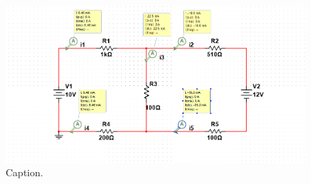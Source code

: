 \begin{figure}[tp]
    \centering
    \includegraphics[width=\linewidth]{figs/demo.png}
    \caption{Caption.}
    \label{fig:template}
\end{figure}
